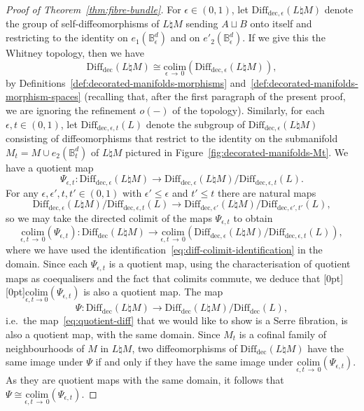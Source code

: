\documentclass[AHL,Unicode,published]{cedram}
\newcommand{\colim}{\mathrm{colim}}
\newcommand{\rdec}{\mathrm{dec}}
\newcommand{\bB}{\mathbb{B}}
\newcommand{\too}{\ensuremath{\longrightarrow}}
\newcommand{\diffdec}{\ensuremath{\mathrm{Diff}_{\rdec}}}
\newcommand{\diffdece}{\ensuremath{\mathrm{Diff}_{\rdec,\epsilon}}}
\newcommand{\diffdeceprime}{\ensuremath{\mathrm{Diff}_{\rdec,\epsilon'}}}
\newcommand{\diffdecet}{\ensuremath{\mathrm{Diff}_{\rdec,\epsilon,t}}}
\newcommand{\diffdecetprime}{\ensuremath{\mathrm{Diff}_{\rdec,\epsilon',t'}}}
\renewcommand{\leq}{\leqslant}
\begin{document}
\begin{proof}[Proof of Theorem~\ref{thm:fibre-bundle}]
For $\epsilon \in (0,1)$, let $\diffdece(L\natural M)$ denote the group of self-diffeomorphisms of $L\natural M$ sending $A \sqcup B$ onto itself and restricting to the identity on $e_{1}(\bB_{\epsilon}^d)$ and on $e'_{2}(\bB_{\epsilon}^d)$. If we give this the Whitney topology, then we have
\begin{equation}\label{eq:diff-colimit-identification}
\diffdec(L\natural M) \cong \underset{\epsilon\,\to\,0}{\colim} (\diffdece(L\natural M)),
\end{equation}
by Definitions~\ref{def:decorated-manifolds-morphisms} and~\ref{def:decorated-manifolds-morphism-spaces} (recalling that, after the first paragraph of the present proof, we are ignoring the refinement $o(-)$ of the topology). Similarly, for each $\epsilon,t \in (0,1)$, let $\diffdecet(L)$ denote the subgroup of $\diffdece(L\natural M)$ consisting of diffeomorphisms that restrict to the identity on the submanifold $M_t = M \cup e_{2}(\bB_t^d)$ of $L\natural M$ pictured in Figure~\ref{fig:decorated-manifolds-Mt}. We have a quotient map
\[
\Psi_{\epsilon,t} \colon \diffdece(L\natural M) \too \diffdece(L\natural M) / \diffdecet(L).
\]
For any $\epsilon,\epsilon',t,t' \in (0,1)$ with $\epsilon' \leq \epsilon$ and $t' \leq t$ there are natural maps
\[
\diffdece(L\natural M) / \diffdecet(L) \too \diffdeceprime(L\natural M) / \diffdecetprime(L),
\]
so we may take the directed colimit of the maps $\Psi_{\epsilon,t}$ to obtain
\[
\underset{\epsilon,t\,\to\,0}{\colim}(\Psi_{\epsilon,t}) \colon \diffdec(L\natural M) \too \underset{\epsilon,t\,\to\,0}{\colim}\left(\diffdece(L\natural M) / \diffdecet(L)\right),
\]
where we have used the identification~\eqref{eq:diff-colimit-identification} in the domain. Since each $\Psi_{\epsilon,t}$ is a quotient map, using the characterisation of quotient maps as coequalisers and the fact that colimits commute, we deduce that \raisebox{0pt}[0pt][0pt]{$\underset{\epsilon,t\to 0}{\colim}(\Psi_{\epsilon,t})$} is also a quotient map. The map
\[
\Psi \colon \diffdec(L \natural M) \too \diffdec(L\natural M) / \diffdec(L),
\]
i.e.~the map~\eqref{eq:quotient-diff} that we would like to show is a Serre fibration, is also a quotient map, with the same domain. Since $M_t$ is a cofinal family of neighbourhoods of $M$ in $L \natural M$, two diffeomorphisms of $\diffdec(L \natural M)$ have the same image under $\Psi$ if and only if they have the same image under $\underset{\epsilon,t\,\to\,0}{\colim}(\Psi_{\epsilon,t})$. As they are quotient maps with the same domain, it follows that $\Psi \cong \underset{\epsilon,t\,\to\,0}{\colim}(\Psi_{\epsilon,t})$.


\end{proof}
\end{document}
